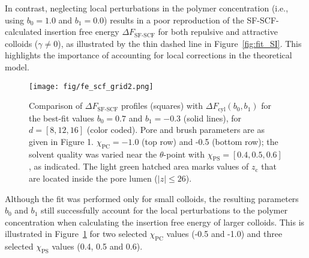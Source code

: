 \documentclass[10pt, a4paper, twocolumn]{article}
\begin{document}
In contrast, neglecting local perturbations in the polymer concentration (i.e., using $b_0 = 1.0$ and $b_1 = 0.0$) results in a poor reproduction of the SF-SCF-calculated insertion free energy $\Delta F_{\text{SF-SCF}}$ for both repulsive and attractive colloids ($\gamma \neq 0$), as illustrated by the thin dashed line in Figure~\ref{fig:fit_SI}. This highlights the importance of accounting for local corrections in the theoretical model.

\begin{figure}[]
    \centering
    \texttt{[image: fig/fe\_scf\_grid2.png]}
    \caption{ 
    Comparison of $\Delta F_{\text{SF-SCF}}$ profiles (squares) with $\Delta F_{\text{cyl}}(b_0,b_1)$ for the best-fit values $b_0 = 0.7$ and $b_1 = -0.3$ (solid lines), for $d = [8, 12, 16]$ (color coded).
    Pore and brush parameters are as given in Figure 1. $\chi_{\text{PC}} = -1.0$ (top row) and -0.5 (bottom row); the solvent quality was varied near the $\theta$-point with $\chi_{\text{PS}} = [0.4, 0.5, 0.6]$, as indicated.
    The light green hatched area marks values of $z_{\text{c}}$ that are located inside the pore lumen ($|z| \leq 26$).
    \label{fig:fe_scf_grid}
    }
\end{figure}

Although the fit was performed only for small colloids, the resulting parameters $b_{0}$ and $b_{1}$ still successfully account for the local perturbations to the polymer concentration when calculating the insertion free energy of larger colloids.
This is illustrated in Figure~\ref{fig:fe_scf_grid} for two selected $\chi_{\text{PC}}$ values (-0.5 and -1.0) and three selected $\chi_{\text{PS}}$ values (0.4, 0.5 and 0.6).
\end{document}
